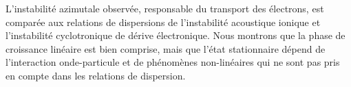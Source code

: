 {L'instabilité azimutale observée, responsable du transport des électrons, est comparée aux relations de dispersions de l'instabilité acoustique ionique et l'instabilité cyclotronique de dérive électronique. 
Nous montrons que la phase de croissance linéaire est bien comprise, mais que l'état stationnaire dépend de l'interaction onde-particule et de phénomènes non-linéaires qui ne sont pas pris en compte dans les relations de dispersion. 
% 
% 
% 
% 

}															%

